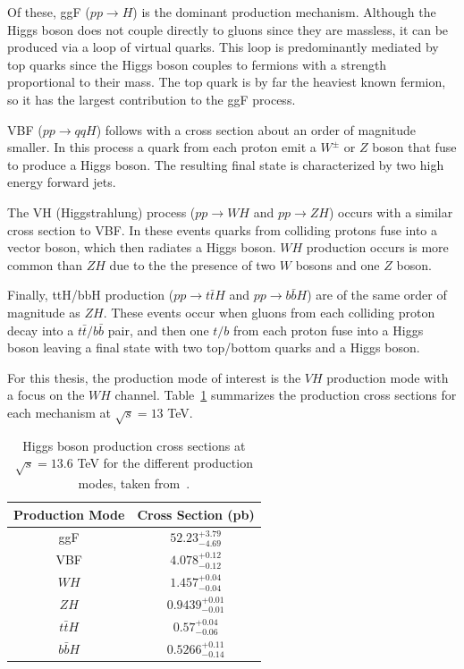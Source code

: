 Of these, ggF ($pp \rightarrow H$) is the dominant production mechanism. Although the Higgs boson does not couple directly to gluons since they are massless, it can be produced via a loop of virtual quarks. This loop is predominantly mediated by top quarks since the Higgs boson couples to fermions with a strength proportional to their mass. The top quark is by far the heaviest known fermion, so it has the largest contribution to the ggF process.

VBF ($pp \rightarrow qqH$) follows with a cross section about an order of magnitude smaller. In this process a quark from each proton emit a $W^{\pm}$ or $Z$ boson that fuse to produce a Higgs boson. The resulting final state is characterized by two high energy forward jets. 

The VH (Higgstrahlung) process ($pp \rightarrow WH$ and $pp \rightarrow ZH$) occurs with a similar cross section to VBF\@. In these events quarks from colliding protons fuse into a vector boson, which then radiates a Higgs boson. $WH$ production occurs is more common than $ZH$ due to the the presence of two $W$ bosons and one $Z$ boson. 

Finally, ttH/bbH production ($pp \rightarrow t\bar{t}H$ and $pp \rightarrow b\bar{b}H$) are of the same order of magnitude as $ZH$. These events occur when gluons from each colliding proton decay into a $t\bar{t} \slash b\bar{b}$ pair, and then one $t \slash b$ from each proton fuse into a Higgs boson leaving a final state with two top/bottom quarks and a Higgs boson. 

For this thesis, the production mode of interest is the $VH$ production mode with a focus on the $WH$ channel. Table~\ref{tab:higgs_production_cross_sections} summarizes the production cross sections for each mechanism at $\sqrt{s} = 13$ TeV.

\begin{table}
  \centering
  \begin{tabular}{c|c}
    \hline
    Production Mode & Cross Section (pb) \\
    \hline
    ggF & $52.23^{+3.79}_{-4.69}$ \\
    VBF & $4.078^{+0.12}_{-0.12}$ \\
    $WH$ & $1.457^{+0.04}_{-0.04}$ \\
    $ZH$ & $0.9439^{+0.01}_{-0.01}$ \\
    $t\bar{t}H$ & $0.57^{+0.04}_{-0.06}$ \\
    $b\bar{b}H$ & $0.5266^{+0.11}_{-0.14}$ \\
    \hline
  \end{tabular}
  \caption{Higgs boson production cross sections at $\sqrt{s} = 13.6$ TeV for the different production modes, taken from~\cite{Higgs_production_cross_sections}.}\label{tab:higgs_production_cross_sections}
\end{table}

